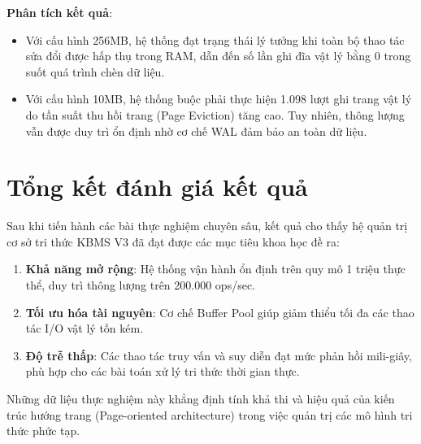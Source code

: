 \noindent \textbf{Phân tích kết quả}:
\begin{itemize}
    \item Với cấu hình 256MB, hệ thống đạt trạng thái lý tưởng khi toàn bộ thao tác sửa đổi được hấp thụ trong RAM, dẫn đến số lần ghi đĩa vật lý bằng 0 trong suốt quá trình chèn dữ liệu.
    \item Với cấu hình 10MB, hệ thống buộc phải thực hiện 1.098 lượt ghi trang vật lý do tần suất thu hồi trang (Page Eviction) tăng cao. Tuy nhiên, thông lượng vẫn được duy trì ổn định nhờ cơ chế WAL đảm bảo an toàn dữ liệu.
\end{itemize}

\section{Tổng kết đánh giá kết quả}

Sau khi tiến hành các bài thực nghiệm chuyên sâu, kết quả cho thấy hệ quản trị cơ sở tri thức KBMS V3 đã đạt được các mục tiêu khoa học đề ra:
\begin{enumerate}
    \item \textbf{Khả năng mở rộng}: Hệ thống vận hành ổn định trên quy mô 1 triệu thực thể, duy trì thông lượng trên 200.000 ops/sec.
    \item \textbf{Tối ưu hóa tài nguyên}: Cơ chế Buffer Pool giúp giảm thiểu tối đa các thao tác I/O vật lý tốn kém.
    \item \textbf{Độ trễ thấp}: Các thao tác truy vấn và suy diễn đạt mức phản hồi mili-giây, phù hợp cho các bài toán xử lý tri thức thời gian thực.
\end{enumerate}

Những dữ liệu thực nghiệm này khẳng định tính khả thi và hiệu quả của kiến trúc hướng trang (Page-oriented architecture) trong việc quản trị các mô hình tri thức phức tạp.
